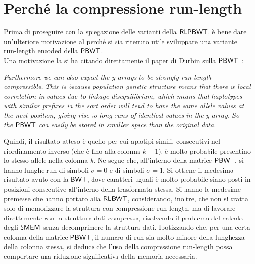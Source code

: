 \section{Perché la compressione run-length}
Prima di proseguire con la spiegazione delle varianti della
$\mbox{\rm {\sf RLPBWT}}$, è bene dare 
un'ulteriore motivazione al perché si sia ritenuto utile sviluppare una variante
run-length encoded della $\mbox{\rm {\sf PBWT}}$.\\
Una motivazione la si ha citando direttamente il paper di Durbin sulla
$\mbox{\rm {\sf PBWT}}$ \cite{pbwt}: 
\begin{center}
  \textit{Furthermore we can also expect the $y$ arrays to be strongly
    run-length compressible. This is because population genetic structure means
    that there 
    is local correlation in values due to linkage disequilibrium, which means
    that haplotypes with similar prefixes in the sort order will tend to have
    the same allele values at the next position, giving rise to long runs of
    identical values in the $y$ array. So the $\mbox{\rm {\sf PBWT}}$ can easily be stored in
    smaller space than the original data.} 
\end{center}
Quindi, il risultato atteso è quello per cui aplotipi simili, consecutivi nel
riordinamento inverso (che è fino alla colonna $k-1$), è
molto probabile presentino lo stesso 
allele nella colonna $k$. Ne segue che, all'interno della matrice $\mbox{\rm {\sf PBWT}}$,
si hanno lunghe run di simboli $\sigma=0$ e di simboli
$\sigma=1$.
Si ottiene il medesimo risultato avuto con
la $\mbox{\rm {\sf BWT}}$, dove caratteri uguali è molto probabile siano posti
in posizioni consecutive all'interno della trasformata stessa. Si hanno le
medesime premesse che hanno portato alla $\mbox{\rm {\sf RLBWT}}$, considerando, inoltre,
che non si tratta solo di memorizzare la struttura con
compressione run-length, ma di lavorare direttamente con la struttura dati
compressa, risolvendo il problema del calcolo degli $\mbox{\rm {\sf SMEM}}$ senza
decomprimere la struttura dati. Ipotizzando che, per una certa colonna della
matrice $\mbox{\rm {\sf PBWT}}$, il numero di run sia molto minore della lunghezza della
colonna stessa, si deduce che l'uso della compressione run-length
possa comportare una riduzione significativa della memoria necessaria.
